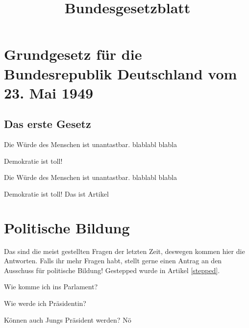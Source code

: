 \documentclass{sasbase}
\begin{document}
\title{Bundesgesetzblatt}

\setcounter{secnumdepth}{5}

\mytitle


\section{Grundgesetz für die Bundesrepublik Deutschland vom 23. Mai 1949}

\lipsum[1]

\subsection{Das erste Gesetz}

\squarestyle
\begin{article}[Menschenwürde]
    \label{blabla}
    \item Die Würde des Menschen ist unantastbar. blablabl
        blabla
    \item Demokratie ist toll!
\end{article}

\parensstyle
\begin{article}[Menschenwürde]
    \item Die Würde des Menschen ist unantastbar. blablabl
        blabla
    \item Demokratie ist toll! Das ist Artikel \thearticleno
\end{article}

\section{Politische Bildung}

Das sind die meist gestellten Fragen der letzten Zeit, deswegen
kommen hier die Antworten. Falls ihr mehr Fragen habt, stellt gerne
einen Antrag an den Ausschuss für politische Bildung!
Gestepped wurde in Artikel \ref{stepped}.


\begin{question}{Wie komme ich ins Parlament?}
    \lipsum[3]
\end{question}

\begin{question}{Wie werde ich Präsidentin?}
    \lipsum[5]
\end{question}

\begin{question}{Können auch Jungs Präsident werden?}
    Nö
\end{question}
\end{document}

